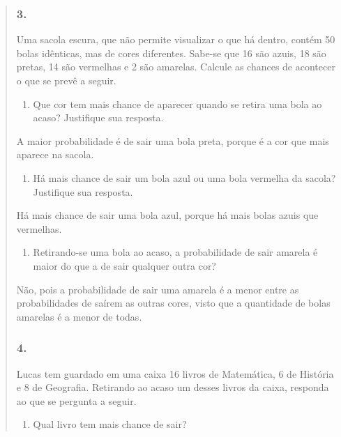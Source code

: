\begin{enumerate}
\begin{escolha}
\begin{enumerate}
\begin{itemize}
\begin{itemize}
\begin{escolha}
\begin{quote}
\begin{escolha}
\subsubsection{3.}\label{section-80}

Uma sacola escura, que não permite visualizar o que há dentro, contém
50 bolas idênticas, mas de cores diferentes. Sabe-se que 16 são azuis,
18 são pretas, 14 são vermelhas e 2 são amarelas. Calcule as chances de
acontecer o que se prevê a seguir.

\begin{enumerate}
\def\labelenumi{\alph{enumi})}
\item
  Que cor tem mais chance de aparecer quando se retira uma bola ao acaso? Justifique sua resposta.
\end{enumerate}

A maior probabilidade é de sair uma bola preta, porque é a cor que mais aparece na sacola.

\begin{enumerate}
\def\labelenumi{\alph{enumi})}
\item
  Há mais chance de sair um bola azul ou uma bola vermelha da sacola? Justifique sua resposta.
\end{enumerate}

Há mais chance de sair uma bola azul, porque há mais bolas azuis que vermelhas.

\begin{enumerate}
\def\labelenumi{\alph{enumi})}
\item
  Retirando-se uma bola ao acaso, a probabilidade de sair amarela é maior do que a de sair qualquer
  outra cor?
\end{enumerate}

Não, pois a probabilidade de sair uma amarela é a menor entre as
  probabilidades de saírem as outras cores, visto que a quantidade de
  bolas amarelas é a menor de todas.


\subsubsection{4.}\label{section-81}

Lucas tem guardado em uma caixa 16 livros de Matemática, 6 de História e
8 de Geografia. Retirando ao acaso um desses livros da caixa, responda ao que se pergunta a seguir.

\begin{enumerate}
\def\labelenumi{\alph{enumi})}
\item
  Qual livro tem mais chance de sair?
\end{enumerate}


\end{escolha}
\end{quote}
\end{escolha}
\end{itemize}
\end{itemize}
\end{enumerate}
\end{escolha}
\end{enumerate}
